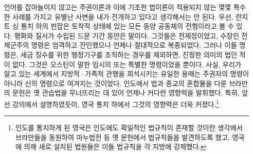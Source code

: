 언어를 잡아늘이지 않고는
주권이론과 이에 기초한 법이론이
적용되지 않는 몇몇 특수한 사례를 가지고 유별난 사변을
내가 전개하고 있다고 생각해서는 안 된다.
우선, 란지트 싱 통치 하의 펀잡은
토착적 상태에 있는 모든 동양 공동체의 전형이라고 볼 수 있다.
평화와 질서가 수립된 드문 기간 동안은 말이다.
그것들은 전제정이었고,
수장인 전제군주의 명령은 엄격하고 잔인했으나
언제나 절대적으로 복종되었다.
그러나 이들 명령은,
세금 징수를 위한 행정기구를 조직하는 경우를 제외하면,
진정한 의미의 법인 적이 없다.
그것은 오스틴이 말한 임시의 또는 특별한 명령이었을 뿐이다.
사실,
우리가 알고 있는 세계에서
지방적·가족적 관행을 희석시키는 유일한 용매는
주권자의 명령이 아니라 신의 명령으로 여겨지는 것이었다.
인도에서 법과 종교의 혼합물을 다룬 브라만의 문헌은
옛 관습법을 무너뜨리는 데 있어 언제나 커다란 영향력을 발휘했다.
특히, 앞선 강의에서 설명하였듯이, 영국 통치 하에서
그것의 영향력은 더욱 커졌다.\footnote{%
  인도를 통치하게 된 영국은 인도에도
  획일적인 법규칙이 존재할 것이란 생각에서
  브라만들을 동원하여 마누법전 등 옛 문헌에서 법규칙들을
  발견하도록 했고, 영국에 의해
  새로 설치된 법원들은 이들 법규칙을 각 지방에 강제했다. }

